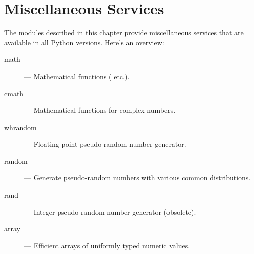 \chapter{Miscellaneous Services}

The modules described in this chapter provide miscellaneous services
that are available in all Python versions.  Here's an overview:

\begin{description}

\item[math]
--- Mathematical functions ( etc.).

\item[cmath]
--- Mathematical functions for complex numbers.

\item[whrandom]
--- Floating point pseudo-random number generator.

\item[random]
--- Generate pseudo-random numbers with various common distributions.

\item[rand]
--- Integer pseudo-random number generator (obsolete).

\item[array]
--- Efficient arrays of uniformly typed numeric values.

\end{description}
